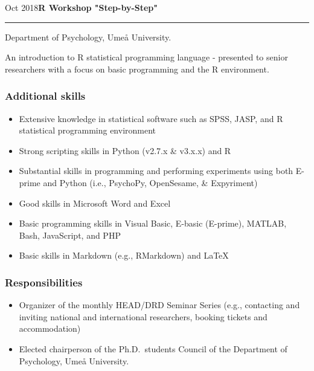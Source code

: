 \documentclass[]{article}
\providecommand{\tightlist}{%
  \setlength{\itemsep}{0pt}\setlength{\parskip}{0pt}}
\begin{document}
Oct 2018\hspace{0.75cm}\textbf{R Workshop "Step-by-Step"}\vspace{1mm}

\hrule
\begin{changemargin}{2.15cm}{2.4cm}


Department of Psychology, Umeå University.

An introduction to R statistical programming language - presented to senior researchers with a focus on basic programming and the R environment.

\end{changemargin}

\hypertarget{additional-skills}{%
\subsubsection{Additional skills}\label{additional-skills}}

\begin{itemize}
\tightlist
\item
  Extensive knowledge in statistical software such as SPSS, JASP, and R
  statistical programming environment
\item
  Strong scripting skills in Python (v2.7.x \& v3.x.x) and R
\item
  Substantial skills in programming and performing experiments using
  both E-prime and Python (i.e., PsychoPy, OpenSesame, \& Expyriment)
\item
  Good skills in Microsoft Word and Excel
\item
  Basic programming skills in Visual Basic, E-basic (E-prime), MATLAB,
  Bash, JavaScript, and PHP
\item
  Basic skills in Markdown (e.g., RMarkdown) and \LaTeX
\end{itemize}

\hypertarget{responsibilities}{%
\subsubsection{Responsibilities}\label{responsibilities}}

\begin{itemize}
\tightlist
\item
  Organizer of the monthly HEAD/DRD Seminar Series (e.g., contacting and
  inviting national and international researchers, booking tickets and
  accommodation)
\item
  Elected chairperson of the Ph.D.~students Council of the Department of
  Psychology, Umeå University.
\end{itemize}
\end{document}
